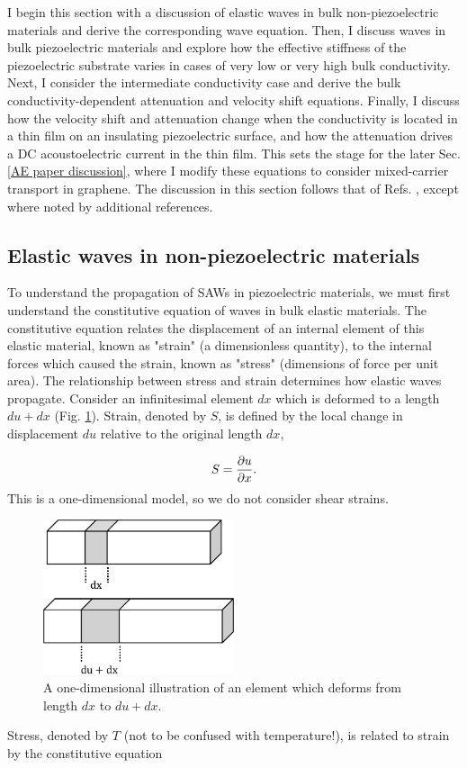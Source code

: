 \documentclass[double,12pt,1in]{beavtex}
\begin{document}
I begin this section with a discussion of elastic waves in bulk non-piezoelectric materials and derive the corresponding wave equation. Then, I discuss waves in bulk piezoelectric materials and explore how the effective stiffness of the piezoelectric substrate varies in cases of very low or very high bulk conductivity. Next, I consider the intermediate conductivity case and derive the bulk conductivity-dependent attenuation and velocity shift equations. Finally, I discuss how the velocity shift and attenuation change when the conductivity is located in a thin film on an insulating piezoelectric surface, and how the attenuation drives a DC acoustoelectric current in the thin film. This sets the stage for the later Sec. \ref{AE paper discussion}, where I modify these equations to consider mixed-carrier transport in graphene. The discussion in this section follows that of Refs. \cite{weinreich_acoustodynamic_1956, hutson_elastic_1962, wixforth_surface_1989}, except where noted by additional references.

\subsection{Elastic waves in non-piezoelectric materials}
To understand the propagation of SAWs in piezoelectric materials, we must first understand the constitutive equation of waves in bulk elastic materials. The constitutive equation relates the displacement of an internal element of this elastic material, known as "strain" (a dimensionless quantity), to the internal forces which caused the strain, known as "stress" (dimensions of force per unit area). The relationship between stress and strain determines how elastic waves propagate. Consider an infinitesimal element $dx$ which is deformed to a length $du + dx$ (Fig. \ref{dfield}). Strain, denoted by $S$, is defined by the local change in displacement $du$ relative to the original length $dx$, 

\begin{equation}
    S = \pdv{u}{x}. \label{strain-displacement equation}
\end{equation}
This is a one-dimensional model, so we do not consider shear strains.
\begin{figure}
    \includegraphics[width = 0.5\textwidth]{displacement field.pdf}
    \caption{A one-dimensional illustration of an element which deforms from length $dx$ to $du + dx$.} \label{dfield}
\end{figure}
Stress, denoted by $T$ (not to be confused with temperature!), is related to strain by the constitutive equation
\end{document}
